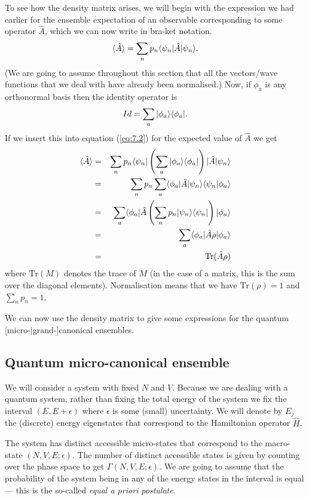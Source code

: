 \documentclass{article}
\begin{document}
To see how the density matrix arises, we will begin with the expression we had earlier for the ensemble expectation of an observable corresponding to some operator $\hat{A}$, which we can now write in bra-ket notation.
\begin{equation}
	\langle\hat{A}\rangle = \sum_n p_n\langle \psi_n |\hat{A}| \psi_n \rangle.
	\label{eq:7.2}
\end{equation}
(We are going to assume throughout this section that all the vectors/wave functions that we deal with have already been normalised.) Now, if $\phi_a$ is any orthonormal basis then the identity operator is
$$
	Id = \sum_a| \phi_a \rangle\langle \phi_a |.
$$
If we insert this into equation (\ref{eq:7.2}) for the expected value of $\hat{A}$ we get
\begin{eqnarray*}
	\langle\hat{A}\rangle &=& \sum_n p_n\langle \psi_n | \left(\sum_a| \phi_a \rangle\langle \phi_a |\right) |\hat{A}| \psi_n \rangle\\
	&=& \sum_n p_n\sum_a\langle \phi_a |\hat{A}| \psi_n \rangle\langle \psi_n | \phi_a\rangle\\
	&=& \sum_a \langle \phi_a |\hat{A} \left(\sum_n p_n | \psi_n \rangle\langle \psi_n |\right)| \phi_a \rangle\\
	&=& \sum_a \langle \phi_a |\hat{A}\rho| \phi_a \rangle\\
	&=& \text{Tr}(\hat{A}\rho)
\end{eqnarray*}
where $\text{Tr}(M)$ denotes the trace of $M$ (in the case of a matrix, this is the sum over the diagonal elements).
Normalisation means that we have $\text{Tr}(\rho)=1$ and $\sum_n p_n=1$.

We can now use the density matrix to give some expressions for the quantum [micro-$|$grand-]canonical ensembles.

\subsection{Quantum micro-canonical ensemble}
We will consider a system with fixed $N$ and $V$. Because we are dealing with a quantum system, rather than fixing the total energy of the system we fix the interval $(E,E+\epsilon)$ where $\epsilon$ is some (small) uncertainty. We will denote by $E_j$ the (discrete) energy eigenstates that correspond to the Hamiltonian operator $\hat{H}$.

The system has distinct accessible micro-states that correspond to the macro-state $(N,V,E;\epsilon)$. The number of distinct accessible states is given by counting over the phase space to get $\Gamma(N,V,E;\epsilon)$. We are going to assume that the probability of the system being in any of the energy states in the interval is equal --- this is the so-called \emph{equal a priori postulate}.
\end{document}
